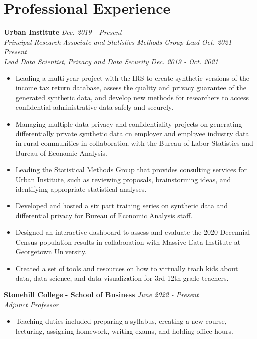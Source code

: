\documentclass[12, letterpaper, roman]{moderncv} %
\newcommand{\workspace}{\vspace{3pt}}
\begin{document}
\section{Professional Experience}

\textbf{Urban Institute} \hfill \textit{Dec. 2019 - Present}\\
\textit{Principal Research Associate and Statistics Methods Group Lead} \hfill \textit{Oct. 2021 - Present}\\
\textit{Lead Data Scientist, Privacy and Data Security} \hfill \textit{Dec. 2019 - Oct. 2021}
    \begin{itemize}
        \item Leading a multi-year project with the IRS to create synthetic versions of the income tax return database, assess the quality and privacy guarantee of the generated synthetic data, and develop new methods for researchers to access confidential administrative data safely and securely.
        \item Managing multiple data privacy and confidentiality projects on generating differentially private synthetic data on employer and employee industry data in rural communities in collaboration with the Bureau of Labor Statistics and Bureau of Economic Analysis.
        \item Leading the Statistical Methods Group that provides consulting services for Urban Institute, such as reviewing proposals, brainstorming ideas, and identifying appropriate statistical analyses.
        \item Developed and hosted a six part training series on synthetic data and differential privacy for Bureau of Economic Analysis staff.
        \item Designed an interactive dashboard to assess and evaluate the 2020 Decennial Census population results in collaboration with Massive Data Institute at Georgetown University.
        \item Created a set of tools and resources on how to virtually teach kids about data, data science, and data visualization for 3rd-12th grade teachers.
    \end{itemize}

\workspace

\textbf{Stonehill College - School of Business} \hfill \textit{June 2022 - Present}\\
\textit{Adjunct Professor}
\begin{itemize}
    \item Teaching duties included preparing a syllabus, creating a new course, lecturing, assigning homework, writing exams, and holding office hours.
\end{itemize}
\end{document}
